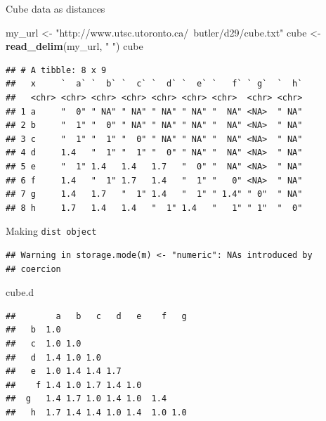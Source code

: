\documentclass[ignorenonframetext,]{beamer}
\newenvironment{Shaded}{\begin{snugshade}}{\end{snugshade}}
\newcommand{\DecValTok}[1]{\textcolor[rgb]{0.00,0.00,0.81}{#1}}
\newcommand{\KeywordTok}[1]{\textcolor[rgb]{0.13,0.29,0.53}{\textbf{#1}}}
\newcommand{\NormalTok}[1]{#1}
\newcommand{\OperatorTok}[1]{\textcolor[rgb]{0.81,0.36,0.00}{\textbf{#1}}}
\newcommand{\StringTok}[1]{\textcolor[rgb]{0.31,0.60,0.02}{#1}}
\begin{document}
\begin{frame}[fragile]{Cube data as distances}
\protect\hypertarget{cube-data-as-distances}{}

\begin{Shaded}
\begin{Highlighting}[]
\NormalTok{my_url <-}\StringTok{ "http://www.utsc.utoronto.ca/~butler/d29/cube.txt"}
\NormalTok{cube <-}\StringTok{ }\KeywordTok{read_delim}\NormalTok{(my_url, }\StringTok{" "}\NormalTok{)}
\NormalTok{cube}
\end{Highlighting}
\end{Shaded}

\begin{verbatim}
## # A tibble: 8 x 9
##   x     `  a` `  b` `  c` `  d` `  e` `   f` ` g`  `  h`
##   <chr> <chr> <chr> <chr> <chr> <chr> <chr>  <chr> <chr>
## 1 a     "  0" " NA" " NA" " NA" " NA" "  NA" <NA>  " NA"
## 2 b     "  1" "  0" " NA" " NA" " NA" "  NA" <NA>  " NA"
## 3 c     "  1" "  1" "  0" " NA" " NA" "  NA" <NA>  " NA"
## 4 d     1.4   "  1" "  1" "  0" " NA" "  NA" <NA>  " NA"
## 5 e     "  1" 1.4   1.4   1.7   "  0" "  NA" <NA>  " NA"
## 6 f     1.4   "  1" 1.7   1.4   "  1" "   0" <NA>  " NA"
## 7 g     1.4   1.7   "  1" 1.4   "  1" " 1.4" " 0"  " NA"
## 8 h     1.7   1.4   1.4   "  1" 1.4   "   1" " 1"  "  0"
\end{verbatim}

\end{frame}

\begin{frame}[fragile]{Making \texttt{dist\ object}}
\protect\hypertarget{making-dist-object}{}

\begin{Shaded}
\end{Shaded}

\begin{verbatim}
## Warning in storage.mode(m) <- "numeric": NAs introduced by
## coercion
\end{verbatim}

\begin{Shaded}
\begin{Highlighting}[]
\NormalTok{cube.d}
\end{Highlighting}
\end{Shaded}

\begin{verbatim}
##        a   b   c   d   e    f   g
##   b  1.0                         
##   c  1.0 1.0                     
##   d  1.4 1.0 1.0                 
##   e  1.0 1.4 1.4 1.7             
##    f 1.4 1.0 1.7 1.4 1.0         
##  g   1.4 1.7 1.0 1.4 1.0  1.4    
##   h  1.7 1.4 1.4 1.0 1.4  1.0 1.0
\end{verbatim}

\end{frame}
\end{document}
